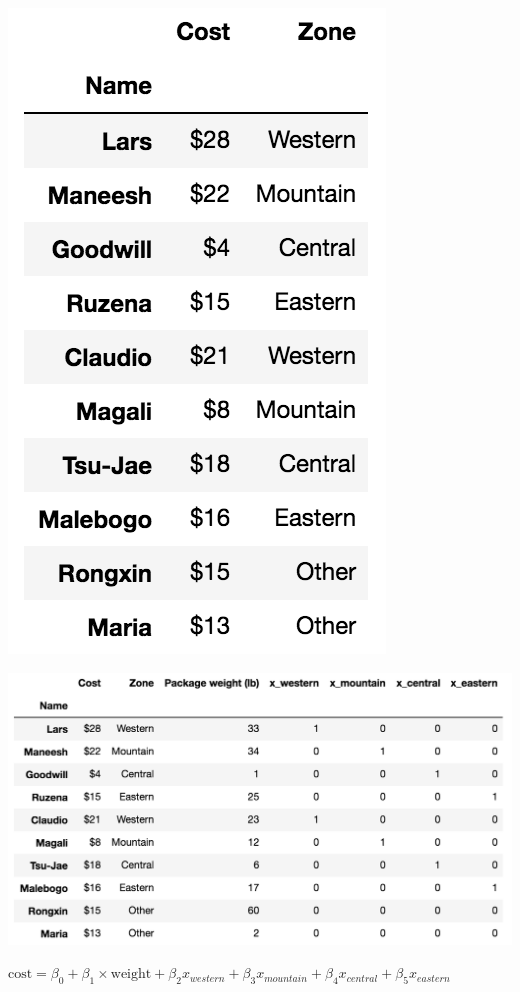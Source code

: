 \documentclass[12pt]{article}
\numberwithin{figure}{section}
\numberwithin{table}{section}
\numberwithin{equation}{section}
\begin{document}
\begin{enumerate}
\includegraphics[height=0.35\textheight]{data_frame}

\ifx\status\undefined
\begin{shaded}
\includegraphics[height=0.35\textheight]{data_frame_solved}

$\text{cost} = \beta_0 + \beta_1 \times \text{weight} + \beta_2 x_{western} + \beta_3 x_{mountain} + \beta_4 x_{central} + \beta_5 x_{eastern}$

\end{shaded}
\else
\vspace*{4cm} 
\fi
\end{enumerate}
\end{document}
